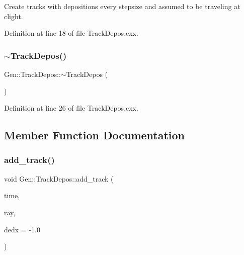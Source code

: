 Create tracks with depositions every stepsize and assumed to be traveling at clight. 

Definition at line 18 of file Track\+Depos.\+cxx.

\mbox{\label{class_wire_cell_1_1_gen_1_1_track_depos_a41f8d22bd935a3f211bee15f2dbbef2c}} 
\subsubsection{\texorpdfstring{$\sim$\+Track\+Depos()}{~TrackDepos()}}
{\footnotesize\ttfamily Gen\+::\+Track\+Depos\+::$\sim$\+Track\+Depos (\begin{DoxyParamCaption}{ }\end{DoxyParamCaption})\hspace{0.3cm}{\ttfamily [virtual]}}



Definition at line 26 of file Track\+Depos.\+cxx.



\subsection{Member Function Documentation}
\mbox{\label{class_wire_cell_1_1_gen_1_1_track_depos_adae13601f092202fbdc66c3d0be8be8a}} 
\subsubsection{\texorpdfstring{add\+\_\+track()}{add\_track()}}
{\footnotesize\ttfamily void Gen\+::\+Track\+Depos\+::add\+\_\+track (\begin{DoxyParamCaption}\item[{double}]{time,  }\item[{const \hyperlink{namespace_wire_cell_a3ab20d9b438feb7eb1ffaab9ba98af0c}{Wire\+Cell\+::\+Ray} \&}]{ray,  }\item[{double}]{dedx = {\ttfamily -\/1.0} }\end{DoxyParamCaption})}

